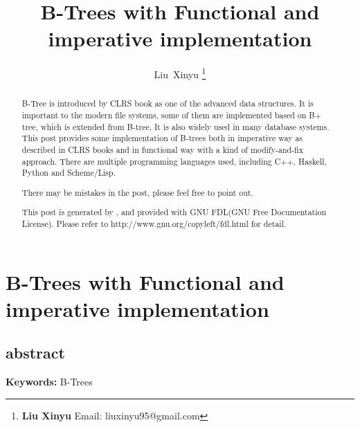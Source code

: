 \documentclass{article}
\begin{document}
\fi


\title{B-Trees with Functional and imperative implementation}

\author{Liu~Xinyu
\thanks{{\bfseries Liu Xinyu } \newline
  Email: liuxinyu95@gmail.com \newline}
  }


\maketitle

\ifx\wholebook\relax
\chapter{B-Trees with Functional and imperative implementation}

\section{abstract}
\else
\begin{abstract}
\fi
B-Tree is introduced by CLRS book as one of the advanced data
structures. It is important to the modern file systems, some of them
are implemented based on B+ tree, which is extended from B-tree.
It is also widely used in many database systems. This post provides
some implementation of B-trees both in imperative way as described in
CLRS books and in functional way with a kind of modify-and-fix
approach. There are multiple programming languages used, including
C++, Haskell, Python and Scheme/Lisp.

There may be mistakes in the post, please feel free to point out.

This post is generated by \LaTeXe, and provided with GNU FDL(GNU Free Documentation License).
Please refer to http://www.gnu.org/copyleft/fdl.html for detail.

\ifx\wholebook\relax \else
\end{abstract}
\fi

\vspace{3cm}
{\bfseries Keywords:} B-Trees
\end{document}
